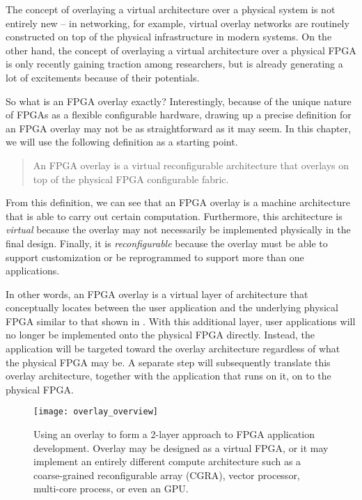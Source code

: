 The concept of overlaying a virtual architecture over a physical system is not entirely new -- in networking, for example, virtual overlay networks are routinely constructed on top of the physical infrastructure in modern systems.
On the other hand, the concept of overlaying a virtual architecture over a physical FPGA is only recently gaining traction among researchers, but is already generating a lot of excitements because of their potentials.



So what is an FPGA overlay exactly?
Interestingly, because of the unique nature of FPGAs as a flexible configurable hardware, drawing up a precise definition for an FPGA overlay may not be as straightforward as it may seem. 
In this chapter, we will use the following definition as a starting point.

\begin{quote}
An FPGA overlay is a virtual reconfigurable architecture that overlays on top of the physical FPGA configurable fabric.
\end{quote}

From this definition, we can see that an FPGA overlay is a machine architecture that is able to carry out certain computation.  Furthermore, this architecture is \emph{virtual} because the overlay may not necessarily be implemented physically in the final design.  Finally, it is \emph{reconfigurable} because the overlay must be able to support customization or be reprogrammed to support more than one applications.

In other words, an FPGA overlay is a virtual layer of architecture that conceptually locates between the user application and the underlying physical FPGA similar to that shown in .
With this additional layer, user applications will no longer be implemented onto the physical FPGA directly.
Instead, the application will be targeted toward the overlay architecture regardless of what the physical FPGA may be.
A separate step will subsequently translate this overlay architecture, together with the application that runs on it, on to the physical FPGA.

\begin{figure}
\centering
\texttt{[image: overlay\_overview]}
\caption{Using an overlay to form a 2-layer approach to FPGA application development.  Overlay may be designed as a virtual FPGA, or it may implement an entirely different compute architecture such as a coarse-grained reconfigurable array (CGRA), vector processor, multi-core process, or even an GPU.}
\label{fig:overlay_overview}
\end{figure}

